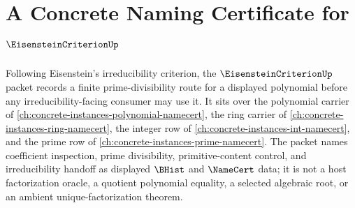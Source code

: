\chapter{A Concrete Naming Certificate for $\EisensteinCriterionUp$}
\label{ch:concrete-instances-eisenstein-criterion-namecert}

Following Eisenstein's irreducibility criterion, the $\EisensteinCriterionUp$ packet records a finite prime-divisibility route for a displayed polynomial before any irreducibility-facing consumer may use it. It sits over the polynomial carrier of \autoref{ch:concrete-instances-polynomial-namecert}, the ring carrier of \autoref{ch:concrete-instances-ring-namecert}, the integer row of \autoref{ch:concrete-instances-int-namecert}, and the prime row of \autoref{ch:concrete-instances-prime-namecert}. The packet names coefficient inspection, prime divisibility, primitive-content control, and irreducibility handoff as displayed $\BHist$ and $\NameCert$ data; it is not a host factorization oracle, a quotient polynomial equality, a selected algebraic root, or an ambient unique-factorization theorem.

